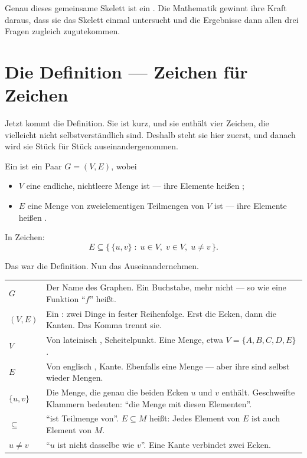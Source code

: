 Genau dieses gemeinsame Skelett ist ein . Die Mathematik gewinnt ihre Kraft daraus, dass sie das Skelett einmal untersucht und die Ergebnisse dann allen drei Fragen zugleich zugutekommen.

\section{Die Definition --- Zeichen für Zeichen}

Jetzt kommt die Definition. Sie ist kurz, und sie enthält vier Zeichen, die vielleicht nicht selbstverständlich sind. Deshalb steht sie hier zuerst, und danach wird sie Stück für Stück auseinandergenommen.

\begin{definition}
Ein  ist ein Paar $G = (V, E)$, wobei
\begin{itemize}[leftmargin=1.4em, itemsep=3pt]
\item $V$ eine endliche, nichtleere Menge ist --- ihre Elemente heißen ;
\item $E$ eine Menge von zweielementigen Teilmengen von $V$ ist --- ihre Elemente heißen .
\end{itemize}
In Zeichen:
\[ E \subseteq \bigl\{\, \{u,v\} \;:\; u \in V,\; v \in V,\; u \neq v \,\bigr\}. \]
\end{definition}

Das war die Definition. Nun das Auseinandernehmen.

\begin{merksatz}
\begin{center}
{\small
\renewcommand{\arraystretch}{1.55}
\begin{tabular}{@{}P{1.6cm}P{7.0cm}@{}}
\toprule
$G$ & Der Name des Graphen. Ein Buchstabe, mehr nicht --- so wie eine Funktion \enquote{$f$} heißt.\\
$(V,E)$ & Ein : zwei Dinge in fester Reihenfolge. Erst die Ecken, dann die Kanten. Das Komma trennt sie.\\
$V$ & Von lateinisch , Scheitelpunkt. Eine Menge, etwa $V = \{A, B, C, D, E\}$.\\
$E$ & Von englisch , Kante. Ebenfalls eine Menge --- aber ihre  sind selbst wieder Mengen.\\
$\{u,v\}$ & Die Menge, die genau die beiden Ecken $u$ und $v$ enthält. Geschweifte Klammern bedeuten: \enquote{die Menge mit diesen Elementen}.\\
$\subseteq$ & \enquote{ist Teilmenge von}. $E \subseteq M$ heißt: Jedes Element von $E$ ist auch Element von $M$.\\
$u \neq v$ & \enquote{$u$ ist nicht dasselbe wie $v$}. Eine Kante verbindet zwei  Ecken.\\
\bottomrule
\end{tabular}}
\end{center}
\end{merksatz}

